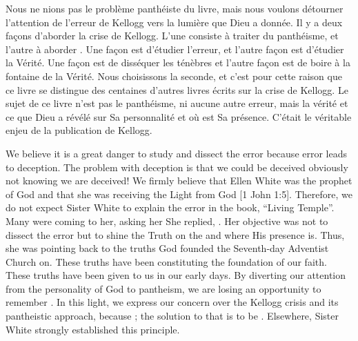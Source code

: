 Nous ne nions pas le problème panthéiste du livre, mais nous voulons détourner l'attention de l'erreur de Kellogg vers la lumière que Dieu a donnée. Il y a deux façons d'aborder la crise de Kellogg. L'une consiste à traiter du panthéisme, et l'autre à aborder . Une façon est d'étudier l'erreur, et l'autre façon est d'étudier la Vérité. Une façon est de disséquer les ténèbres et l'autre façon est de boire à la fontaine de la Vérité. Nous choisissons la seconde, et c'est pour cette raison que ce livre se distingue des centaines d'autres livres écrits sur la crise de Kellogg. Le sujet de ce livre n'est pas le panthéisme, ni aucune autre erreur, mais la vérité et ce que Dieu a révélé sur Sa personnalité et où est Sa présence. C'était le véritable enjeu de la publication de Kellogg.


We believe it is a great danger to study and dissect the error because error leads to deception. The problem with deception is that we could be deceived obviously not knowing we are deceived! We firmly believe that Ellen White was the prophet of God and that she was receiving the Light from God [1 John 1:5]. Therefore, we do not expect Sister White to explain the error in the book, “Living Temple”. Many were coming to her, asking her  She replied, . Her objective was not to dissect the error but to shine the Truth on the  and where His presence is. Thus, she was pointing back to the truths God founded the Seventh-day Adventist Church on. These truths have been constituting the foundation of our faith. These truths have been given to us in our early days. By diverting our attention from the personality of God to pantheism, we are losing an opportunity to remember . In this light, we express our concern over the Kellogg crisis and its pantheistic approach, because ; the solution to that is to be . Elsewhere, Sister White strongly established this principle.


